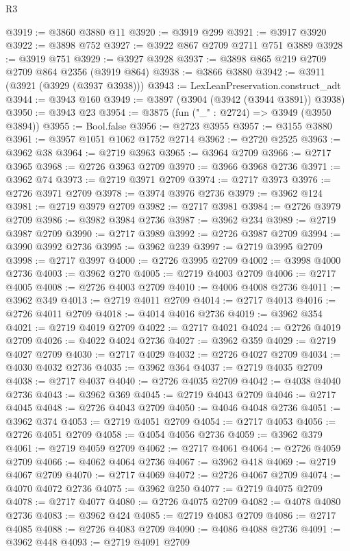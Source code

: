 \begin{lexlean}{R3}
\begin{coremodule}
@3919 := @3860 @3880 @11
@3920 := @3919 @299
@3921 := @3917 @3920
@3922 := @3898 @752
@3927 := @3922 @867 @2709 @2711 @751 @3889
@3928 := @3919 @751
@3929 := @3927 @3928
@3937 := @3898 @865 @219 @2709 @2709 @864 @2356 (@3919 @864)
@3938 := @3866 @3880
@3942 := @3911 (@3921 (@3929 (@3937 @3938)))
@3943 := LexLeanPreservation.construct_adt
@3944 := @3943 @160
@3949 := @3897 (@3904 (@3942 (@3944 @3891)) @3938)
@3950 := @3943 @23
@3954 := @3875 (fun ("_" : @2724) => @3949 (@3950 @3894))
@3955 := Bool.false
@3956 := @2723 @3955
@3957 := @3155 @3880
@3961 := @3957 @1051 @1062 @1752 @2714
@3962 := @2720 @2525
@3963 := @3962 @38
@3964 := @2719 @3963
@3965 := @3964 @2709
@3966 := @2717 @3965
@3968 := @2726 @3963 @2709
@3970 := @3966 @3968 @2736
@3971 := @3962 @74
@3973 := @2719 @3971 @2709
@3974 := @2717 @3973
@3976 := @2726 @3971 @2709
@3978 := @3974 @3976 @2736
@3979 := @3962 @124
@3981 := @2719 @3979 @2709
@3982 := @2717 @3981
@3984 := @2726 @3979 @2709
@3986 := @3982 @3984 @2736
@3987 := @3962 @234
@3989 := @2719 @3987 @2709
@3990 := @2717 @3989
@3992 := @2726 @3987 @2709
@3994 := @3990 @3992 @2736
@3995 := @3962 @239
@3997 := @2719 @3995 @2709
@3998 := @2717 @3997
@4000 := @2726 @3995 @2709
@4002 := @3998 @4000 @2736
@4003 := @3962 @270
@4005 := @2719 @4003 @2709
@4006 := @2717 @4005
@4008 := @2726 @4003 @2709
@4010 := @4006 @4008 @2736
@4011 := @3962 @349
@4013 := @2719 @4011 @2709
@4014 := @2717 @4013
@4016 := @2726 @4011 @2709
@4018 := @4014 @4016 @2736
@4019 := @3962 @354
@4021 := @2719 @4019 @2709
@4022 := @2717 @4021
@4024 := @2726 @4019 @2709
@4026 := @4022 @4024 @2736
@4027 := @3962 @359
@4029 := @2719 @4027 @2709
@4030 := @2717 @4029
@4032 := @2726 @4027 @2709
@4034 := @4030 @4032 @2736
@4035 := @3962 @364
@4037 := @2719 @4035 @2709
@4038 := @2717 @4037
@4040 := @2726 @4035 @2709
@4042 := @4038 @4040 @2736
@4043 := @3962 @369
@4045 := @2719 @4043 @2709
@4046 := @2717 @4045
@4048 := @2726 @4043 @2709
@4050 := @4046 @4048 @2736
@4051 := @3962 @374
@4053 := @2719 @4051 @2709
@4054 := @2717 @4053
@4056 := @2726 @4051 @2709
@4058 := @4054 @4056 @2736
@4059 := @3962 @379
@4061 := @2719 @4059 @2709
@4062 := @2717 @4061
@4064 := @2726 @4059 @2709
@4066 := @4062 @4064 @2736
@4067 := @3962 @418
@4069 := @2719 @4067 @2709
@4070 := @2717 @4069
@4072 := @2726 @4067 @2709
@4074 := @4070 @4072 @2736
@4075 := @3962 @250
@4077 := @2719 @4075 @2709
@4078 := @2717 @4077
@4080 := @2726 @4075 @2709
@4082 := @4078 @4080 @2736
@4083 := @3962 @424
@4085 := @2719 @4083 @2709
@4086 := @2717 @4085
@4088 := @2726 @4083 @2709
@4090 := @4086 @4088 @2736
@4091 := @3962 @448
@4093 := @2719 @4091 @2709

\end{coremodule}
\end{lexlean}
